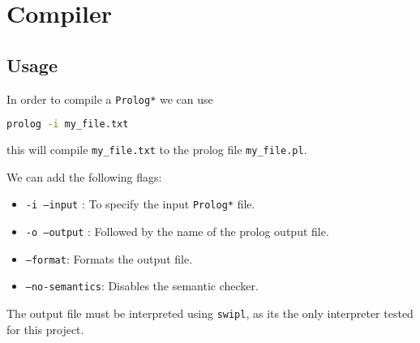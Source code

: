 \section{Compiler}

\subsection{Usage}

In order to compile a \texttt{Prolog*} we can use 

\begin{lstlisting}[language = bash]
    prolog -i my_file.txt 
\end{lstlisting}

this will compile \texttt{my\_file.txt} to the prolog file \texttt{my\_file.pl}. 

We can add the following flags:

\begin{itemize}
    \item \texttt{-i --input} : To specify the input \texttt{Prolog*} file.
    \item \texttt{-o --output} : Followed by the name of the prolog output file.
    \item \texttt{--format}: Formats the output file.
    \item \texttt{--no-semantics}: Disables the semantic checker.
\end{itemize}

\begin{note}
    The output file must be interpreted using \texttt{swipl}, as its the only interpreter tested
    for this project.
\end{note}

